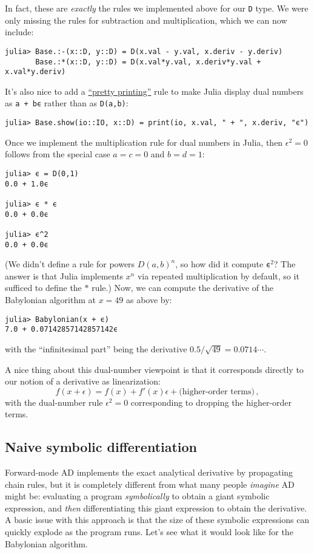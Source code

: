 In fact, these are \emph{exactly} the rules we implemented above for our \texttt{D} type. We were only missing the rules for subtraction and multiplication, which we can now include:
\begin{verbatim}
julia> Base.:-(x::D, y::D) = D(x.val - y.val, x.deriv - y.deriv)
       Base.:*(x::D, y::D) = D(x.val*y.val, x.deriv*y.val + x.val*y.deriv)
\end{verbatim}
It's also nice to add a \href{https://docs.julialang.org/en/v1/manual/types/#man-custom-pretty-printing}{``pretty printing''} rule to make Julia display dual numbers as \texttt{a + bϵ} rather than as \texttt{D(a,b)}:
\begin{verbatim}
julia> Base.show(io::IO, x::D) = print(io, x.val, " + ", x.deriv, "ϵ")
\end{verbatim}
Once we implement the multiplication rule for dual numbers in Julia, then $\epsilon^2 = 0$ follows from the special case $a = c=0$ and $b=d=1$:
\begin{verbatim}
julia> ϵ = D(0,1)
0.0 + 1.0ϵ

julia> ϵ * ϵ 
0.0 + 0.0ϵ

julia> ϵ^2
0.0 + 0.0ϵ
\end{verbatim}
(We didn't define a rule for powers $D(a,b)^n$, so how did it compute \texttt{ϵ}$^2$? The answer is that Julia implements $x^n$ via repeated multiplication by default, so it sufficed to define the $*$ rule.)  Now, we can compute the derivative of the Babylonian algorithm at $x = 49$ as above by:
\begin{verbatim}
julia> Babylonian(x + ϵ)
7.0 + 0.07142857142857142ϵ
\end{verbatim}
with the ``infinitesimal part'' being the derivative $0.5/\sqrt{49} = 0.0714\cdots$.

A nice thing about this dual-number viewpoint is that it corresponds directly to our notion of a derivative as linearization:
$$
f(x + \epsilon) = f(x) + f'(x) \epsilon + \mbox{(higher-order terms)} \, ,
$$
with the dual-number rule $\epsilon^2 = 0$ corresponding to dropping the higher-order terms.


\subsection{Naive symbolic differentiation}

Forward-mode AD implements the exact analytical derivative by propagating chain rules, but it is completely different from what many people \emph{imagine} AD might be: evaluating a program \emph{symbolically} to obtain a giant symbolic expression, and \emph{then} differentiating this giant expression to obtain the derivative.   A basic issue with this approach is that the size of these symbolic expressions can quickly explode as the program runs.  Let's see what it would look like for the Babylonian algorithm.


